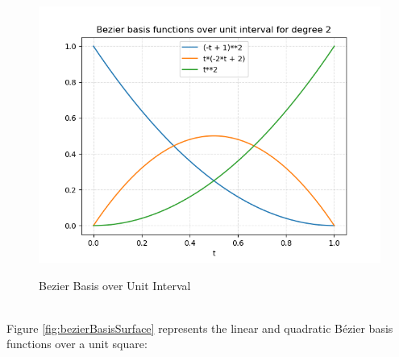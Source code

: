 \documentclass[a4paper, 11pt]{article}
\begin{document}
\begin{enumerate}
\begin{enumerate}[label=\alph*.]
\begin{figure}[h]
{    \includegraphics[scale=0.5]{resources/bezierBasisFunctionCurve2.png} \label{fig:bezierBasisCurve2} 
  } 
  \caption{Bezier Basis over Unit Interval} 
  \centering
  \label{fig:bezierBasisCurve}
\end{figure} \\
Figure \ref{fig:bezierBasisSurface} represents the linear and quadratic B\'{e}zier basis functions over a unit square: 
\begin{figure}[ht] 
 \quad 
\end{figure}
\end{enumerate}
\end{enumerate}
\end{document}
